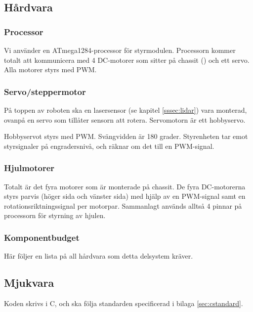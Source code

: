 \documentclass[a4paper,11pt]{article}
\begin{document}
\subsection{Hårdvara}

\subsubsection{Processor}
Vi använder en ATmega1284-processor för styrmodulen. Processorn kommer totalt att kommunicera med 4 DC-motorer som sitter på chassit (\cite{terminator}) och ett servo. Alla motorer styrs med PWM.

\clearpage

\subsubsection{Servo/steppermotor} \label{ssec:servomotor}
På toppen av roboten ska en lasersensor (se kapitel \ref{sssec:lidar}) vara monterad, ovanpå en servo som tillåter sensorn att rotera. Servomotorn är ett hobbyservo.

Hobbyservot styrs med PWM. Svängvidden är 180 grader. Styrenheten tar emot styrsignaler på engradersnivå, och räknar om det till en PWM-signal.


\subsubsection{Hjulmotorer}
Totalt är det fyra motorer som är monterade på chassit. De fyra DC-motorerna styrs parvis (höger sida och vänster sida) med hjälp av en PWM-signal samt en rotationsriktningssignal per motorpar. Sammanlagt används alltså 4 pinnar på processorn för styrning av hjulen.

\subsubsection{Komponentbudget}
Här följer en lista på all hårdvara som detta delsystem kräver.

\begin{HardwareList}
\end{HardwareList}

\subsection{Mjukvara}
Koden skrivs i C, och ska följa standarden specificerad i bilaga \ref{sec:cstandard}. 
\end{document}
